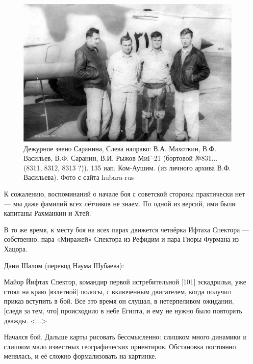 \begin{figure}[h!tb] 
	\centering\includegraphics[scale=0.25]{Dolina_5/jnKCAz-mYKE.jpg}
	\caption{Дежурное звено Саранина, Слева направо: В.А. Махоткин, В.Ф. Васильев, В.Ф. Саранин, В.И. Рыжов МиГ-21 (бортовой №831... (8311, 8312, 8313 ?)). 135 иап. Ком-Аушим. (из личного архива В.Ф. Васильева). Фото с сайта hubara-rus}%
\end{figure}

К сожалению, воспоминаний о начале боя с советской стороны практически нет — мы даже фамилий всех лётчиков не знаем. По одной из версий, ими были капитаны Рахманкин и Хтей.

В то же время, к месту боя на всех парах движется четвёрка Ифтаха Спектора — собственно, пара «Миражей» Спектора из Рефидим и пара Гиоры Фурмана из Хацора.

Дани Шалом (перевод Наума Шубаева):

\begin{textcitation}
	Майор Йифтах Спектор, командир первой истребительной [101] эскадрильи, уже стоял на краю [взлетной] полосы, с включенным двигателем, когда получил приказ вступить в бой. Все это время он слушал, в нетерпеливом ожидании, [следя за тем, что] происходило в небе Египта, и ему не нужно было повторять дважды. <...>
\end{textcitation}

Начался бой. Дальше карты рисовать бессмысленно: слишком много динамики и слишком мало известных географических ориентиров. Обстановка постоянно менялась, и её сложно формализовать на картинке.

